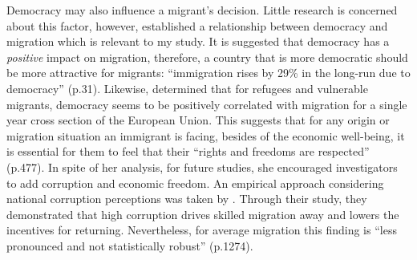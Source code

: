 \documentclass[../main.tex]{subfiles}
\begin{document}
Democracy may also influence a migrant’s decision. Little research is concerned about this factor, however, \textcite{Azad.2020} established a relationship between democracy and migration which is relevant to my study. It is suggested that democracy has a \textit{positive} impact on migration, therefore, a country that is more democratic should be more attractive for migrants: \enquote{immigration rises by 29\% in the long-run due to democracy} (p.31). Likewise, \textcite{Prada.2020} determined that for refugees and vulnerable migrants, democracy seems to be positively correlated with migration for a single year cross section of the European Union. This suggests that for any origin or migration situation an immigrant is facing, besides of the economic well-being, it is essential for them to feel that their \enquote{rights and freedoms are respected} (p.477). In spite of her analysis, for future studies, she encouraged investigators to add corruption and economic freedom. An empirical approach considering national corruption perceptions was taken by \textcite{Dimant.2013}. Through their study, they demonstrated that high corruption drives skilled migration away and lowers the incentives for returning. Nevertheless, for average migration this finding is \enquote{less pronounced and not statistically robust} (p.1274).
\end{document}
